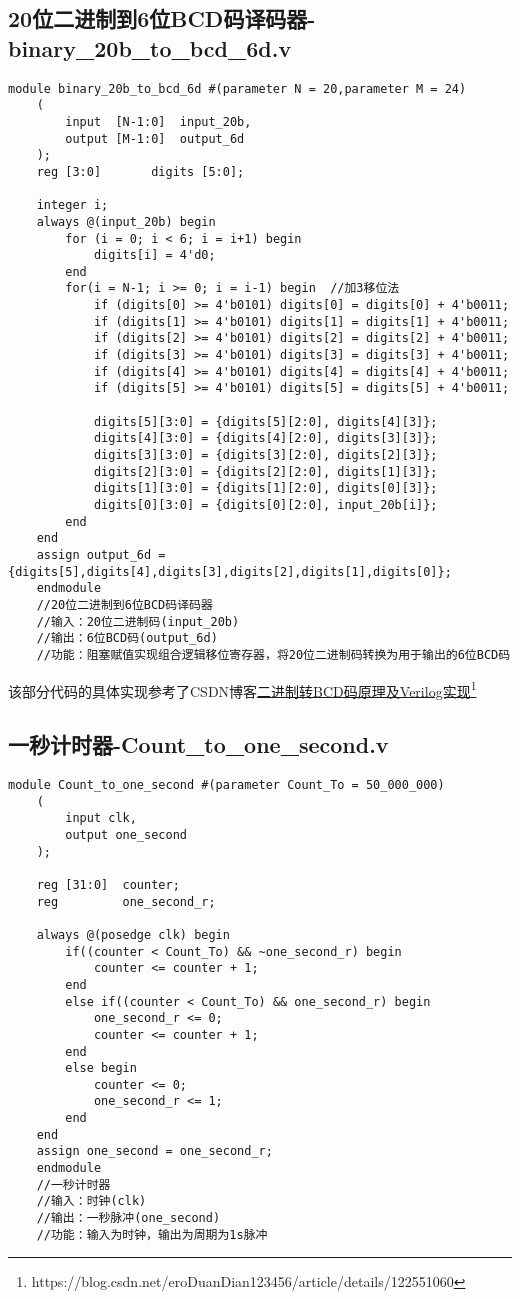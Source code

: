 	\subsection{20位二进制到6位BCD码译码器-binary\_20b\_to\_bcd\_6d.v}
	\begin{lstlisting}[style=verilog]
	module binary_20b_to_bcd_6d #(parameter N = 20,parameter M = 24) 
	(    
		input  [N-1:0]  input_20b,       
		output [M-1:0]  output_6d       
	);  
	reg [3:0]       digits [5:0];       
	
	integer i;    
	always @(input_20b) begin     
		for (i = 0; i < 6; i = i+1) begin
			digits[i] = 4'd0;  
		end 
		for(i = N-1; i >= 0; i = i-1) begin  //加3移位法 
			if (digits[0] >= 4'b0101) digits[0] = digits[0] + 4'b0011;   
			if (digits[1] >= 4'b0101) digits[1] = digits[1] + 4'b0011;   
			if (digits[2] >= 4'b0101) digits[2] = digits[2] + 4'b0011;   
			if (digits[3] >= 4'b0101) digits[3] = digits[3] + 4'b0011;     
			if (digits[4] >= 4'b0101) digits[4] = digits[4] + 4'b0011;    
			if (digits[5] >= 4'b0101) digits[5] = digits[5] + 4'b0011;    
			
			digits[5][3:0] = {digits[5][2:0], digits[4][3]};  
			digits[4][3:0] = {digits[4][2:0], digits[3][3]};  
			digits[3][3:0] = {digits[3][2:0], digits[2][3]};    
			digits[2][3:0] = {digits[2][2:0], digits[1][3]};  
			digits[1][3:0] = {digits[1][2:0], digits[0][3]};   
			digits[0][3:0] = {digits[0][2:0], input_20b[i]};   
		end  
	end	    
	assign output_6d ={digits[5],digits[4],digits[3],digits[2],digits[1],digits[0]};   
	endmodule 
	//20位二进制到6位BCD码译码器
	//输入：20位二进制码(input_20b)
	//输出：6位BCD码(output_6d)
	//功能：阻塞赋值实现组合逻辑移位寄存器，将20位二进制码转换为用于输出的6位BCD码
	\end{lstlisting}
	该部分代码的具体实现参考了CSDN博客\href{https://blog.csdn.net/eroDuanDian123456/article/details/122551060}{二进制转BCD码原理及Verilog实现}\footnote{https://blog.csdn.net/eroDuanDian123456/article/details/122551060}
	\newpage
	\subsection{一秒计时器-Count\_to\_one\_second.v}
	\begin{lstlisting}[style=verilog]
	module Count_to_one_second #(parameter Count_To = 50_000_000)
	(
		input clk,
		output one_second
	);
	
	reg [31:0]  counter;
	reg         one_second_r;
	
	always @(posedge clk) begin
		if((counter < Count_To) && ~one_second_r) begin
			counter <= counter + 1;
		end
		else if((counter < Count_To) && one_second_r) begin
			one_second_r <= 0;
			counter <= counter + 1;
		end
		else begin
			counter <= 0;
			one_second_r <= 1;
		end
	end
	assign one_second = one_second_r;
	endmodule
	//一秒计时器
	//输入：时钟(clk)
	//输出：一秒脉冲(one_second)
	//功能：输入为时钟，输出为周期为1s脉冲
	\end{lstlisting}
	\newpage
